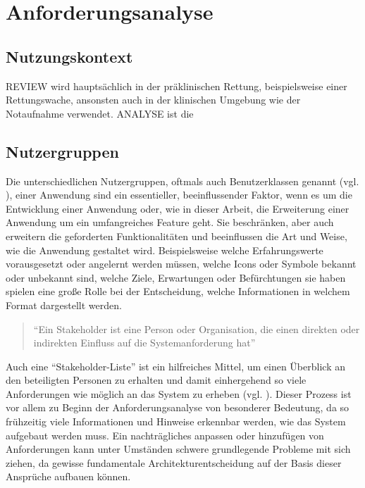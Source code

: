 \chapter{Anforderungsanalyse}
\label{anforderungsanalyse}
\minitoc\pagebreak
\section{Nutzungskontext}
\gls{REVIEW} wird hauptsächlich in der präklinischen Rettung, beispielsweise einer Rettungswache, ansonsten auch in der klinischen Umgebung wie der Notaufnahme verwendet.
\gls{ANALYSE} ist die 
\section{Nutzergruppen}
Die unterschiedlichen Nutzergruppen, oftmals auch Benutzerklassen genannt (vgl. \cite[S. 125]{Herczeg.2018}), einer Anwendung sind ein essentieller, beeinflussender Faktor, wenn es um die Entwicklung einer Anwendung oder, wie in dieser Arbeit, die Erweiterung einer Anwendung um ein umfangreiches Feature geht. Sie beschränken, aber auch erweitern die geforderten Funktionalitäten und beeinflussen die Art und Weise, wie die Anwendung gestaltet wird. Beispielsweise welche Erfahrungswerte vorausgesetzt oder angelernt werden müssen, welche Icons oder Symbole bekannt oder unbekannt sind, welche Ziele, Erwartungen oder Befürchtungen sie haben spielen eine große Rolle bei der Entscheidung, welche Informationen in welchem Format dargestellt werden.

\begin{quote}
"`Ein Stakeholder ist eine Person oder Organisation, die einen direkten oder indirekten Einfluss auf die Systemanforderung hat"' \cite[S.29]{Pohl.2011} 
\end{quote}
Auch eine "`Stakeholder-Liste"' ist ein hilfreiches Mittel, um einen Überblick an den beteiligten Personen zu erhalten und damit einhergehend so viele Anforderungen wie möglich an das System zu erheben (vgl. \cite[S. 83]{Bergsmann.2018}).
Dieser Prozess ist vor allem zu Beginn der Anforderungsanalyse von besonderer Bedeutung, da so frühzeitig viele Informationen und Hinweise erkennbar werden, wie das System aufgebaut werden muss.
Ein nachträgliches anpassen oder hinzufügen von Anforderungen kann unter Umständen schwere grundlegende Probleme mit sich ziehen, da gewisse fundamentale Architekturentscheidung auf der Basis dieser Ansprüche aufbauen können.

